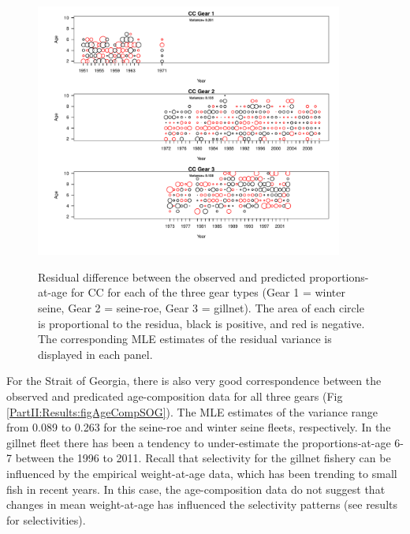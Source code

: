 \begin{figure}
	\centering
	\includegraphics[width=0.9\textwidth]{../FIGS/qPriorFigs/iscam_fig_agecompsresid_CC.pdf}\\
	\caption{Residual difference between the observed and predicted proportions-at-age for CC for each of the three gear types (Gear 1 = winter seine, Gear 2 = seine-roe, Gear 3 = gillnet).  The area of each circle is proportional to the residua, black is positive, and red is negative.  The corresponding MLE estimates of the residual variance is displayed in each panel.}\label{PartII:Results:figAgeCompCC}
\end{figure}

For the Strait of Georgia, there is also very good correspondence between the observed and predicated age-composition data for all three gears (Fig \ref{PartII:Results:figAgeCompSOG}).  The MLE estimates of the variance range from 0.089 to 0.263 for the seine-roe and winter seine fleets, respectively.  In the gillnet fleet  there has been a tendency to under-estimate the proportions-at-age 6-7 between the 1996 to 2011. Recall that selectivity for the gillnet fishery can be influenced by the empirical weight-at-age data, which has been trending to small fish in recent years.  In this case, the age-composition data do not suggest that changes in mean weight-at-age has influenced the selectivity patterns (see results for selectivities).


